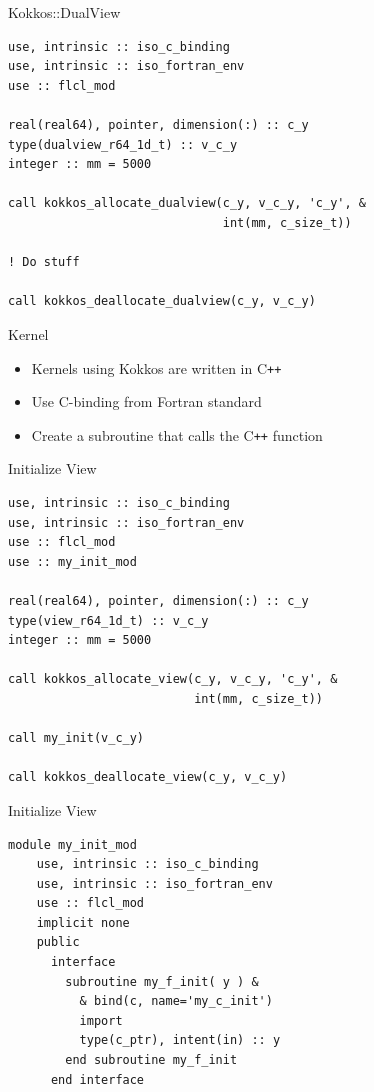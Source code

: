 \begin{frame}[containsverbatim]{Kokkos::DualView}
  \begin{verbatim}
use, intrinsic :: iso_c_binding
use, intrinsic :: iso_fortran_env
use :: flcl_mod

real(real64), pointer, dimension(:) :: c_y
type(dualview_r64_1d_t) :: v_c_y
integer :: mm = 5000

call kokkos_allocate_dualview(c_y, v_c_y, 'c_y', &
                              int(mm, c_size_t))

! Do stuff

call kokkos_deallocate_dualview(c_y, v_c_y)
  \end{verbatim}
\end{frame}

\begin{frame}{Kernel}
  \begin{itemize}
    \item Kernels using Kokkos are written in C\texttt{++}
    \item Use C-binding from Fortran standard 
    \item Create a subroutine that calls the C\texttt{++} function
  \end{itemize}
\end{frame}

\begin{frame}[containsverbatim]{Initialize View}
  \begin{verbatim}
use, intrinsic :: iso_c_binding
use, intrinsic :: iso_fortran_env
use :: flcl_mod
use :: my_init_mod

real(real64), pointer, dimension(:) :: c_y
type(view_r64_1d_t) :: v_c_y
integer :: mm = 5000

call kokkos_allocate_view(c_y, v_c_y, 'c_y', &
                          int(mm, c_size_t))

call my_init(v_c_y)

call kokkos_deallocate_view(c_y, v_c_y)
  \end{verbatim}
\end{frame}

\begin{frame}[containsverbatim]{Initialize View}
  \begin{verbatim}
module my_init_mod
    use, intrinsic :: iso_c_binding
    use, intrinsic :: iso_fortran_env
    use :: flcl_mod
    implicit none
    public
      interface
        subroutine my_f_init( y ) &
          & bind(c, name='my_c_init')
          import
          type(c_ptr), intent(in) :: y
        end subroutine my_f_init
      end interface
  \end{verbatim}
\end{frame}


